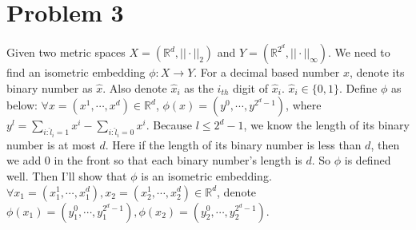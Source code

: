 \documentclass[twoside,11pt]{homework}
\begin{document}
\section*{Problem 3}

Given two metric spaces $X = (\mathbb{R}^d, ||\cdot||_2)$ and $Y = (\mathbb{R}^{2^d}, ||\cdot||_\infty)$. We need to find an isometric embedding $\phi: X \rightarrow Y$. For a decimal based number $x$, denote its binary number as $\hat{x}$. Also denote $\hat{x}_i$ as the $i_{th}$ digit of $\hat{x}_i$. $\hat{x}_i \in \{0,1\}$.
Define $\phi$ as below: $\forall x=(x^1, \cdots, x^d) \in \mathbb{R}^d$, $\phi(x) = (y^0, \cdots, y^{2^d-1})$, where $y^l = \sum_{i:\hat{l}_i=1}x^i - \sum_{i:\hat{l}_i=0}x^i$. Because $l \leq 2^d-1$, we know the length of its binary number is at most $d$. Here if the length of its binary number is less than $d$, then we add 0 in the front so that each binary number's length is $d$. So $\phi$ is defined well. Then I'll show that $\phi$ is an isometric embedding. $\forall x_1=(x_1^1,\cdots,x_1^d),x_2 = (x_2^1,\cdots,x_2^d) \in \mathbb{R}^d$, denote $\phi(x_1) = (y_1^0, \cdots,y_1^{2^d-1}), \phi(x_2) = (y_2^0, \cdots,y_2^{2^d-1})$.
\end{document}

